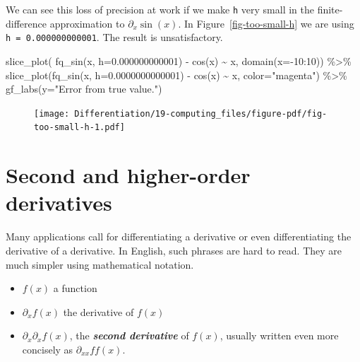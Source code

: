 \documentclass[
  letterpaper,
  DIV=11,
  numbers=noendperiod,
  oneside]{scrreprt}
\newenvironment{Shaded}{\begin{snugshade}}{\end{snugshade}}
\newcommand{\AttributeTok}[1]{\textcolor[rgb]{0.40,0.46,0.14}{#1}}
\newcommand{\DecValTok}[1]{\textcolor[rgb]{0.68,0.00,0.00}{#1}}
\newcommand{\FloatTok}[1]{\textcolor[rgb]{0.68,0.00,0.00}{#1}}
\newcommand{\FunctionTok}[1]{\textcolor[rgb]{0.28,0.35,0.67}{#1}}
\newcommand{\NormalTok}[1]{\textcolor[rgb]{0.00,0.46,0.62}{#1}}
\newcommand{\SpecialCharTok}[1]{\textcolor[rgb]{0.37,0.37,0.37}{#1}}
\newcommand{\StringTok}[1]{\textcolor[rgb]{0.13,0.47,0.30}{#1}}
\providecommand{\tightlist}{%
  \setlength{\itemsep}{0pt}\setlength{\parskip}{0pt}}
\begin{document}
We can see this loss of precision at work if we make \texttt{h} very
small in the finite-difference approximation to \(\partial_x \sin(x)\).
In Figure~\ref{fig-too-small-h} we are using
\texttt{h\ =\ 0.000000000001}. The result is unsatisfactory.

\begin{Shaded}
\begin{Highlighting}[]
\FunctionTok{slice\_plot}\NormalTok{(  }\FunctionTok{fq\_sin}\NormalTok{(x, }\AttributeTok{h=}\FloatTok{0.000000000001}\NormalTok{) }\SpecialCharTok{{-}} \FunctionTok{cos}\NormalTok{(x) }\SpecialCharTok{\textasciitilde{}}\NormalTok{ x, }
           \FunctionTok{domain}\NormalTok{(}\AttributeTok{x=}\SpecialCharTok{{-}}\DecValTok{10}\SpecialCharTok{:}\DecValTok{10}\NormalTok{)) }\SpecialCharTok{\%\textgreater{}\%}
  \FunctionTok{slice\_plot}\NormalTok{(}\FunctionTok{fq\_sin}\NormalTok{(x, }\AttributeTok{h=}\FloatTok{0.0000000000001}\NormalTok{) }\SpecialCharTok{{-}} \FunctionTok{cos}\NormalTok{(x) }\SpecialCharTok{\textasciitilde{}}\NormalTok{ x,}
             \AttributeTok{color=}\StringTok{"magenta"}\NormalTok{) }\SpecialCharTok{\%\textgreater{}\%}
  \FunctionTok{gf\_labs}\NormalTok{(}\AttributeTok{y=}\StringTok{"Error from true value."}\NormalTok{)}
\end{Highlighting}
\end{Shaded}

\begin{figure}[H]


{\centering \texttt{[image: Differentiation/19-computing\_files/figure-pdf/fig-too-small-h-1.pdf]}

}

\end{figure}

\hypertarget{second-and-higher-order-derivatives}{%
\section{Second and higher-order
derivatives}\label{second-and-higher-order-derivatives}}

Many applications call for differentiating a derivative or even
differentiating the derivative of a derivative. In English, such phrases
are hard to read. They are much simpler using mathematical notation.

\begin{itemize}
\tightlist
\item
  \(f(x)\) a function
\item
  \(\partial_x f(x)\) the derivative of \(f(x)\)
\item
  \(\partial_x \partial_x f(x)\), the \textbf{\emph{second derivative}}
  of \(f(x)\), usually written even more concisely as
  \(\partial_{xx}f f(x)\).
\end{itemize}
\end{document}
